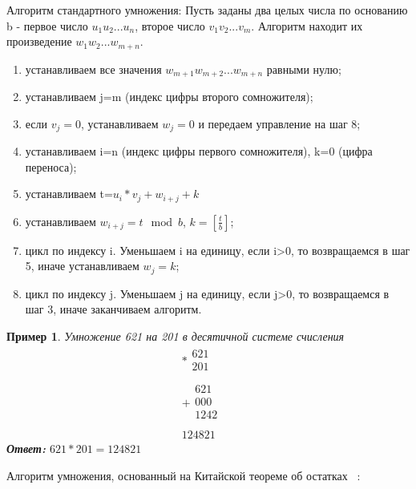 \documentclass[14pt, russian]{scrartcl}
\newcounter{cExample}
\newtheorem{Example}{Пример}[cExample]
\begin{document}
Алгоритм стандартного умножения:
Пусть заданы два целых числа по основанию b - первое число $u_{1}u_{2}...u_{n}$, второе число $v_{1}v_{2}...v_{m}$. Алгоритм находит их произведение $w_{1}w_{2}...w_{m+n}$.
\begin{enumerate}
    \item устанавливаем все значения $w_{m+1}w_{m+2}...w_{m+n}$ равными нулю;
    \item устанавливаем j=m (индекс цифры второго сомножителя);
    \item если $v_{j}=0$, устанавливаем $w_{j}=0$ и передаем управление на шаг 8;
    \item устанавливаем i=n (индекс цифры первого сомножителя), k=0 (цифра переноса);
    \item устанавливаем t=$u_{i}*v_{j}+w_{i+j}+k$
    \item устанавливаем $w_{i+j}=t\mod{b}$, $k=[\frac{t}{b}]$;
    \item цикл по индексу i. Уменьшаем i на единицу, если i>0, то возвращаемся в шаг 5, иначе устанавливаем $w_{j}=k$;
    \item цикл по индексу j. Уменьшаем j на единицу, если j>0, то возвращаемся в шаг 3, иначе заканчиваем алгоритм.
\end{enumerate}
\begin{Example}\label{Example:MathFont5}
Умножение 621 на 201 в десятичной системе счисления
$$
\begin{array}{r}
*
\begin{array}{r}
621\\
201\\
\end{array} \\
\hline
+
\begin{array}{r}
621\\
000\,\,\,\,\\
1242\,\,\,\,\,\,\,\\
\end{array} \\
\hline
124821\,\,\,
\end{array}
$$
\textbf{Ответ:} $621*201 = 124821$ 
\end{Example}
\Newline
Алгоритм умножения, основанный на Китайской теореме об остатках ~\cite{Alghorythm_Chinese}:
\end{document}
